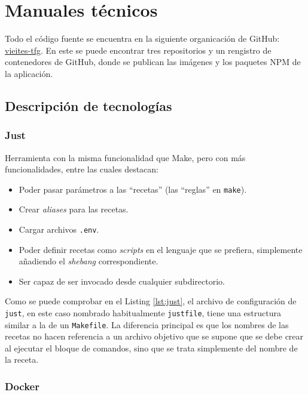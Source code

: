 \chapter{Manuales técnicos}

Todo el código fuente se encuentra en la siguiente organicación de GitHub: \href{https://github.com/vieites-tfg}{vieites-tfg}. En este se puede encontrar tres repositorios y un rengistro de contenedores de GitHub, donde se publican las imágenes y los paquetes NPM de la aplicación.

\section{Descripción de tecnologías}
\label{sec:tech-desc}

\subsection*{Just}
\label{tech:just}

Herramienta con la misma funcionalidad que Make, pero con más funcionalidades, entre las cuales destacan:

\begin{itemize}
  \item Poder pasar parámetros a las ``recetas'' (las ``reglas'' en \texttt{make}).
  \item Crear \textit{aliases} para las recetas.
  \item Cargar archivos \texttt{.env}.
  \item Poder definir recetas como \textit{scripts} en el lenguaje que se prefiera, simplemente añadiendo el \textit{shebang}\cite{shebang} correspondiente.
  \item Ser capaz de ser invocado desde cualquier subdirectorio.
\end{itemize}

Como se puede comprobar en el Listing \ref{lst:just}, el archivo de configuración de \texttt{just}, en este caso nombrado habitualmente \texttt{justfile}, tiene una estructura similar a la de un \texttt{Makefile}. La diferencia principal es que los nombres de las recetas no hacen referencia a un archivo objetivo que se supone que se debe crear al ejecutar el bloque de comandos, sino que se trata simplemente del nombre de la receta.

\subsection*{Docker}
\label{tech:docker}

